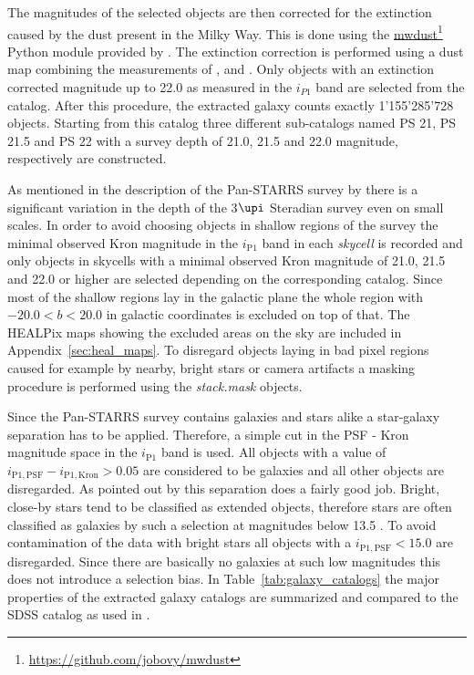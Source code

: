 \documentclass[a4paper,fleqn,usenatbib]{mnras}
\newcommand\fnurl[2]{%
  \href{#2}{#1}\footnote{\url{#2}}%
}
\begin{document}
The magnitudes of the selected objects are then corrected for the extinction caused by the dust present in the Milky Way. This is done using the \fnurl{mwdust}{https://github.com/jobovy/mwdust} Python module provided by \citet{bovy2016galactic}. The extinction correction is performed using a dust map combining the measurements of \citet{marshall2006modelling}, \citet{green2015three} and \citet{drimmel2003three}. Only objects with an extinction corrected magnitude up to 22.0 as measured in the $i_{P1}$ band are selected from the catalog. After this procedure, the extracted galaxy counts exactly 1'155'285'728 objects. Starting from this catalog three different sub-catalogs named PS 21, PS 21.5 and PS 22 with a survey depth of 21.0, 21.5 and 22.0 magnitude, respectively are constructed.

As mentioned in the description of the Pan-STARRS survey by \citet{chambers2016pan} there is a significant variation in the depth of the 3$\upi$ Steradian survey even on small scales. In order to avoid choosing objects in shallow regions of the survey the minimal observed Kron magnitude in the $i_{\mathrm{P1}}$ band in each \textit{skycell} is recorded and only objects in skycells with a minimal observed Kron magnitude of 21.0, 21.5 and 22.0 or higher are selected depending on the corresponding catalog. Since most of the shallow regions lay in the galactic plane the whole region with $-20.0 < b < 20.0$ in galactic coordinates is excluded on top of that. The HEALPix maps showing the excluded areas on the sky are included in Appendix~\ref{sec:heal_maps}. To disregard objects laying in bad pixel regions caused for example by nearby, bright stars or camera artifacts a masking procedure is performed using the \textit{stack.mask} objects.

Since the Pan-STARRS survey contains galaxies and stars alike a star-galaxy separation has to be applied. Therefore, a simple cut in the PSF - Kron magnitude space in the $i_{\mathrm{P1}}$ band is used. All objects with a value of $i_{\mathrm{P1,PSF}} - i_{\mathrm{P1,Kron}}> 0.05$ are considered to be galaxies and all other objects are disregarded. As pointed out by \citet{farrow2013pan} this separation does a fairly good job. Bright, close-by stars tend to be classified as extended objects, therefore stars are often classified as galaxies by such a selection at magnitudes below 13.5 \citep{chambers2016pan}. To avoid contamination of the data with bright stars all objects with a $i_{\mathrm{P1,PSF}} < 15.0$ are disregarded. Since there are basically no galaxies at such low magnitudes this does not introduce a selection bias. In Table~\ref{tab:galaxy_catalogs} the major properties of the extracted galaxy catalogs are summarized and compared to the SDSS catalog as used in \citet{more2016detection}. 
\end{document}
